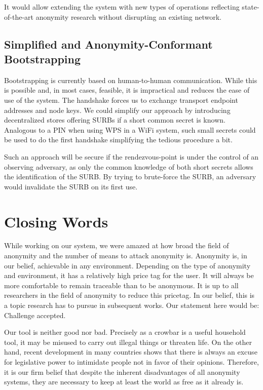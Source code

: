 It would allow extending the system with new types of operations reflecting state-of-the-art anonymity research without disrupting an existing network.

\section{Simplified and Anonymity-Conformant Bootstrapping}
Bootstrapping is currently based on human-to-human communication. While this is possible and, in most cases, feasible, it is impractical and reduces the ease of use of the system. The handshake forces us to exchange transport endpoint addresses and node keys. We could simplify our approach by introducing decentralized stores offering SURBs if a short common secret is known. Analogous to a PIN when using WPS in a WiFi system, such small secrets could be used to do the first handshake simplifying the tedious procedure a bit.

Such an approach will be secure if the rendezvous-point is under the control of an observing adversary, as only the common knowledge of both short secrets allows the identification of the SURB. By trying to brute-force the SURB, an adversary would invalidate the SURB on its first use.

\chapter{Closing Words}
While working on our system, we were amazed at how broad the field of anonymity and the number of means to attack anonymity is. Anonymity is, in our belief, achievable in any environment. Depending on the type of anonymity and environment, it has a relatively high price tag for the user. It will always be more comfortable to remain traceable than to be anonymous. It is up to all researchers in the field of anonymity to reduce this pricetag. In our belief, this is a topic research has to pursue in subsequent works. Our statement here would be: Challenge accepted.

Our tool is neither good nor bad. Precisely as a crowbar is a useful household tool, it may be misused to carry out illegal things or threaten life. On the other hand, recent development in many countries shows that there is always an excuse for legislative power to intimidate people not in favor of their opinions. Therefore, it is our firm belief that despite the inherent disadvantages of all anonymity systems, they are necessary to keep at least the world as free as it already is.